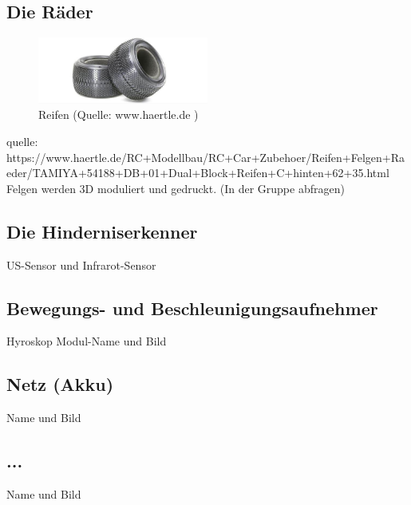 \subsection{Die Räder}

\begin{figure}[!h]  %
	\centering\includegraphics[width=0.5\textwidth]{images/reifen.png}
	\caption{Reifen \newline (Quelle: www.haertle.de )}
	\label{reifen} %
\end{figure}

quelle:
https://www.haertle.de/RC+Modellbau/RC+Car+Zubehoer/Reifen+Felgen+Raeder/TAMIYA+54188+DB+01+Dual+Block+Reifen+C+hinten+62+35.html
Felgen werden 3D moduliert und gedruckt. (In der Gruppe abfragen)

\subsection{Die Hinderniserkenner}


US-Sensor und Infrarot-Sensor

\subsection{Bewegungs- und Beschleunigungsaufnehmer }

Hyroskop Modul-Name und Bild

\subsection{Netz (Akku)}

 Name und Bild
 
 \subsection{...}
 
 Name und Bild

